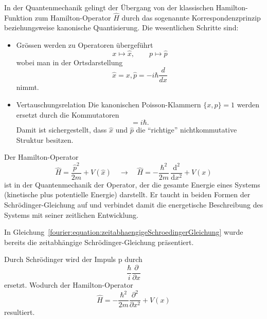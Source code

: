 In der Quantenmechanik gelingt der Übergang von der klassischen Hamilton-Funktion zum Hamilton-Operator $\hat H$ durch das sogenannte Korrespondenzprinzip beziehungsweise kanonische Quantisierung.
Die wesentlichen Schritte sind:
\begin{itemize}
\item Grössen werden zu Operatoren übergeführt %
\begin{equation}
	x \longmapsto \hat{x}, \qquad p \longmapsto \hat{p}
\end{equation}
wobei man in der Ortsdarstellung
\begin{equation}
	\hat{x} = x, \hat{p} = -i \hbar \frac{d}{dx}
\end{equation}
nimmt.
\item Vertauschungsrelation
Die kanonischen Poisson-Klammern $\{x, p\} = 1$ werden ersetzt durch die Kommutatoren
\begin{equation}
	[\hat{x}, \hat{p}] = i \hbar.
\end{equation}
Damit ist sichergestellt, dass $\hat{x}$ und $\hat{p}$ die ``richtige'' nichtkommutative Struktur besitzen.

\end{itemize}
Der Hamilton-Operator
\begin{equation}\label{fourier:equation:hamiltonOperator}
 	\hat{H} = \frac{\hat p^2}{2m} + V(\hat{x})
    \quad\longrightarrow\quad
    \hat{H} = -\frac{\hbar^2}{2m}\,\frac{\mathrm{d}^2}{\mathrm{d}x^2} + V(x)
\end{equation}
ist in der Quantenmechanik der Operator, der die gesamte Energie eines Systems (kinetische plus potentielle Energie) darstellt.
Er taucht in beiden Formen der Schrödinger-Gleichung auf und verbindet damit die energetische Beschreibung des Systems mit seiner zeitlichen Entwicklung.

In Gleichung~\ref{fourier:equation:zeitabhaengigeSchroedingerGleichung} wurde bereits die zeitabhängige Schrödinger-Gleichung präsentiert. %


Durch Schrödinger wird der Impuls p durch
\begin{equation}
	\frac{\hbar}{i} \frac{\partial}{\partial x}
\end{equation}
ersetzt.
Wodurch der Hamilton-Operator
\begin{equation}
	\hat{H} = -\frac{\hbar^2}{2m}\frac{\partial^2}{\partial x^2} + V(x)
\end{equation}	
resultiert.

